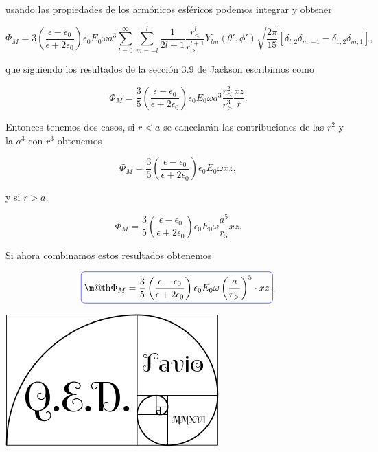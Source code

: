 \documentclass[a4paper,11pt]{article}
\makeatletter
\numberwithin{equation}{section}
\newcommand*{\boxcolor}{blue}
\renewcommand{\boxed}[1]{\textcolor{\boxcolor}{%
\tikz[baseline={([yshift=-1ex]current bounding box.center)}] \node [rectangle, minimum width=1ex,rounded corners,draw] {\normalcolor\m@th$\displaystyle#1$};}}
\makeatother
\begin{document}
usando las propiedades de los armónicos esféricos podemos integrar y obtener 

\begin{equation}
  \Phi_M = 3\left(\frac{\epsilon - \epsilon_0}{\epsilon + 2\epsilon_0}
 \right)\epsilon_0E_0 \omega a^3 \sum_{l=0}^\infty \sum_{m=-l}^l 
 \frac{1}{2l+1}\frac{r_<^l}{r_>^{l+1}}Y_{lm}(\theta',\phi')\sqrt{\frac{2\pi}{15}}
 [\delta_{l,2}\delta_{m,-1} - \delta_{1,2}\delta_{m,1}],
\end{equation}

que siguiendo los resultados de la sección 3.9 de Jackson \cite{jackson} escribimos 
como

\begin{equation}
 \Phi_M = \frac{3}{5}\left(\frac{\epsilon - \epsilon_0}{\epsilon + 2\epsilon_0}
 \right)\epsilon_0E_0 \omega a^3\frac{r_<^2}{r_>^3}\frac{xz}{r}.
\end{equation}

Entonces tenemos dos casos, si $r < a$ se cancelarán las contribuciones de las $r^2$ 
y la $a^3$ con $r^3$ obtenemos 

\begin{equation}
 \Phi_M = \frac{3}{5}\left(\frac{\epsilon - \epsilon_0}{\epsilon + 2\epsilon_0}
 \right)\epsilon_0E_0 \omega xz,
\end{equation}

y si $r>a$, 

\begin{equation}
 \Phi_M = \frac{3}{5}\left(\frac{\epsilon - \epsilon_0}{\epsilon + 2\epsilon_0}
 \right)\epsilon_0E_0 \omega \frac{a^5}{r_5}xz.
\end{equation}

Si ahora combinamos estos resultados obtenemos 

\begin{equation}
\boxed{\Phi_M = \frac{3}{5}\left(\frac{\epsilon - \epsilon_0}{\epsilon + 2\epsilon_0}\right)
\epsilon_0E_0\omega\left(\frac{a}{r_>}\right)^5\cdot xz}.
\end{equation}

\hspace{10cm}\includegraphics[scale=0.25]{logoQED}
\end{document}
